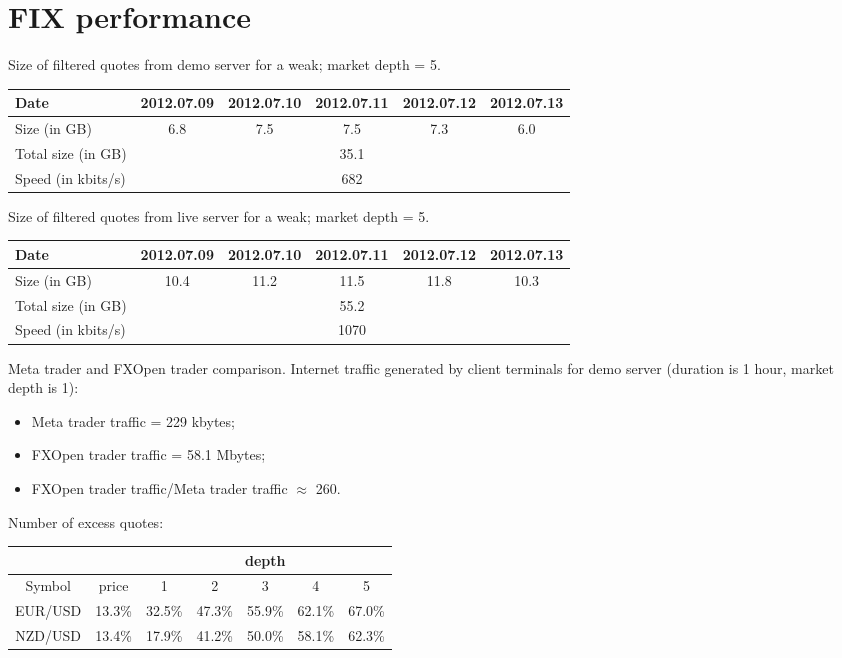 \section{FIX performance}
Size of filtered quotes from demo server for a weak; market depth = 5.
\newline

\begin{tabular}{|l|c|c|c|c|c|}
  \hline
  Date & 2012.07.09 & 2012.07.10 & 2012.07.11 & 2012.07.12 & 2012.07.13 \\   \hline
  Size (in GB) & 6.8 & 7.5 & 7.5 & 7.3 & 6.0 \\  \hline
  Total size (in GB) & \multicolumn{5}{|c|}{35.1} \\  \hline
  Speed (in kbits/s) & \multicolumn{5}{|c|}{682} \\  \hline
\end{tabular}
\newline



Size of filtered quotes from live server for a weak; market depth = 5.
\newline

\begin{tabular}{|l|c|c|c|c|c|}
  \hline
  Date & 2012.07.09 & 2012.07.10 & 2012.07.11 & 2012.07.12 & 2012.07.13 \\   \hline
  Size (in GB) & 10.4  & 11.2 & 11.5 & 11.8  &  10.3\\  \hline
  Total size (in GB) & \multicolumn{5}{|c|}{55.2} \\  \hline
  Speed (in kbits/s) & \multicolumn{5}{|c|}{1070} \\  \hline
\end{tabular}
\newline



Meta trader and FXOpen trader comparison. Internet traffic generated by client terminals for demo server (duration is 1 hour, market depth is 1):

\begin{itemize}[noitemsep, nolistsep]
  \item Meta trader traffic = 229 kbytes;
  \item FXOpen trader traffic = 58.1 Mbytes;
  \item FXOpen trader traffic/Meta trader traffic $\approx$ 260.
\end{itemize}


Number of excess quotes:

\begin{tabular}{|c|c|c|c|c|c|c|}
  \hline
   & &\multicolumn{5}{|c|}{depth} \\ \hline
  Symbol & price & 1 & 2 & 3 & 4 & 5  \\ \hline
  EUR/USD & 13.3\% & 32.5\% &  47.3\%&  55.9\%&  62.1\%& 67.0\% \\ \hline
  NZD/USD & 13.4\% & 17.9\% & 41.2\% & 50.0\% & 58.1\%  &  62.3\%\\ \hline
\end{tabular}
\newline



